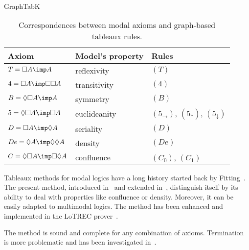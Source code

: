 \begin{entry}{GraphTabK}
\begin{clarifications}
  \begin{table}
  \center
  \begin{tabular}{l l l}
    Axiom & Model's property & Rules \\
    \hline
    $T = \Box A \imp A$ & reflexivity & $(T)$ \\
    $4 = \Box A \imp \Box\Box A$ & transitivity & $(4)$ \\
    $B = \Diamond\Box A \imp A$ & symmetry & $(B)$ \\
    $5 = \Diamond\Box A \imp \Box A$ & euclideanity &
      $(5_{\mathord\rightarrow})$, $(5_{\mathord\uparrow})$, $(5_{\mathord\downarrow})$ \\
    $D = \Box A \imp \Diamond A$ & seriality & $(D)$ \\
    $De = \Diamond A \imp \Diamond\Diamond A$ & density & $(De)$ \\
    $C = \Diamond\Box A \imp \Box\Diamond A$ & confluence & $(C_0)$, $(C_1)$
  \end{tabular}
  \caption{Correspondences between modal axioms and graph-based tableaux rules.}
  \label{tab:GraphTabK}
  \end{table}
\end{clarifications}

\begin{history}
  Tableaux methods for modal logics have a long history started back by Fitting~\cite{fitting.1972}.
  The present method, introduced in~\cite{castilho-farinas-gasquet-herzig.1997} and extended in~\cite{farinas-gasquet.2002},
  distinguish itself by its ability to deal with properties like confluence or density.
  Moreover, it can be easily adapted to multimodal logics.
  The method has been enhanced and implemented in the LoTREC prover~\cite{gasquet-herzig-said-schwarzentruber.2014}.
\end{history}

\begin{technicalities}
  The method is sound and complete for any combination of axioms.
  Termination is more problematic
  and has been investigated in~\cite{farinas-gasquet.2002,gasquet-herzig-sahade.2006,gasquet-herzig-said-schwarzentruber.2014}.
\end{technicalities}



\end{entry}
